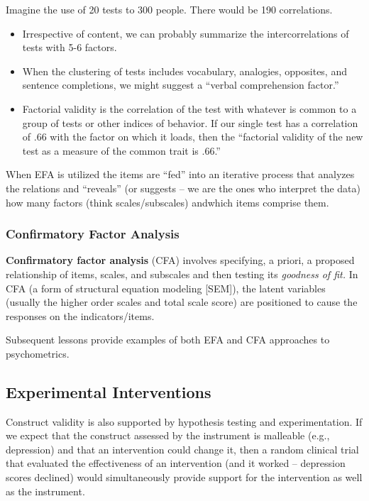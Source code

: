 \documentclass[
  english,
]{book}
\providecommand{\tightlist}{%
  \setlength{\itemsep}{0pt}\setlength{\parskip}{0pt}}
\begin{document}
Imagine the use of 20 tests to 300 people. There would be 190 correlations.

\begin{itemize}
\tightlist
\item
  Irrespective of content, we can probably summarize the intercorrelations of tests with 5-6 factors.
\item
  When the clustering of tests includes vocabulary, analogies, opposites, and sentence completions, we might suggest a ``verbal comprehension factor.''
\item
  Factorial validity is the correlation of the test with whatever is common to a group of tests or other indices of behavior. If our single test has a correlation of .66 with the factor on which it loads, then the ``factorial validity of the new test as a measure of the common trait is .66.''
\end{itemize}

When EFA is utilized the items are ``fed'' into an iterative process that analyzes the relations and ``reveals'' (or suggests -- we are the ones who interpret the data) how many factors (think scales/subscales) andwhich items comprise them.

\hypertarget{confirmatory-factor-analysis}{%
\subsubsection{Confirmatory Factor Analysis}\label{confirmatory-factor-analysis}}

\textbf{Confirmatory factor analysis} (CFA) involves specifying, a priori, a proposed relationship of items, scales, and subscales and then testing its \emph{goodness of fit.} In CFA (a form of structural equation modeling {[}SEM{]}), the latent variables (usually the higher order scales and total scale score) are positioned to cause the responses on the indicators/items.

Subsequent lessons provide examples of both EFA and CFA approaches to psychometrics.

\hypertarget{experimental-interventions}{%
\subsection{Experimental Interventions}\label{experimental-interventions}}

Construct validity is also supported by hypothesis testing and experimentation. If we expect that the construct assessed by the instrument is malleable (e.g., depression) and that an intervention could change it, then a random clinical trial that evaluated the effectiveness of an intervention (and it worked -- depression scores declined) would simultaneously provide support for the intervention as well as the instrument.
\end{document}
